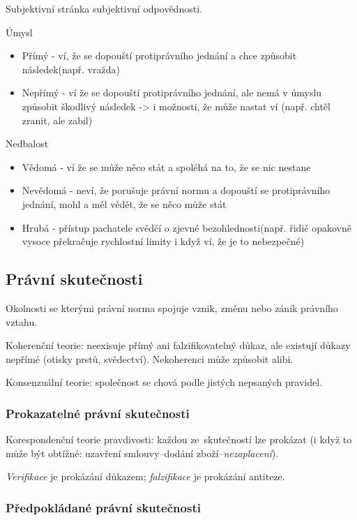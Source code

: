 Subjektivní stránka subjektivní odpovědnosti.

Úmysl
\begin{itemize}
    \item Přímý - ví, že se dopouští protiprávního jednání a chce způsobit následek(např. vražda)
    \item Nepřímý - ví že se dopouští protiprávního jednání, ale nemá v úmyslu způsobit škodlivý následek -> i možnosti, že může nastat ví (např. chtěl zranit, ale zabil)
\end{itemize}
Nedbalost 
\begin{itemize}
    \item Vědomá - ví že se může něco stát a spoléhá na to, že se nic nestane
    \item Nevědomá - neví, že porušuje právní normu a dopouští se protiprávního jednání, mohl a měl vědět, že se něco může stát
    \item Hrubá - přístup pachatele svědčí o zjevné bezohlednosti(např. řidič opakovně vysoce překračuje rychlostní limity i když ví, že je to nebezpečné)
\end{itemize}



\subsection{Právní skutečnosti}

Okolnosti se kterými právní norma spojuje vznik, změnu nebo zánik právního vztahu.

Koherenční teorie: neexisuje přímý ani falzifikovatelný důkaz, ale existují důkazy nepřímé (otisky prstů, svědectví).
Nekoherenci může způsobit alibi.

Konsenzuální teorie: společnost se chová podle jistých nepsaných pravidel.


\subsubsection{Prokazatelné právní skutečnosti}

Korespondenční teorie pravdivosti: každou ze~skutečností lze prokázat (i když to může být obtížné: uzavření smlouvy--dodání zboží--\emph{nezaplacení}).

\emph{Verifikace} je prokázání důkazem; \emph{falzifikace} je prokázání antiteze.


\subsubsection{Předpokládané právní skutečnosti}


